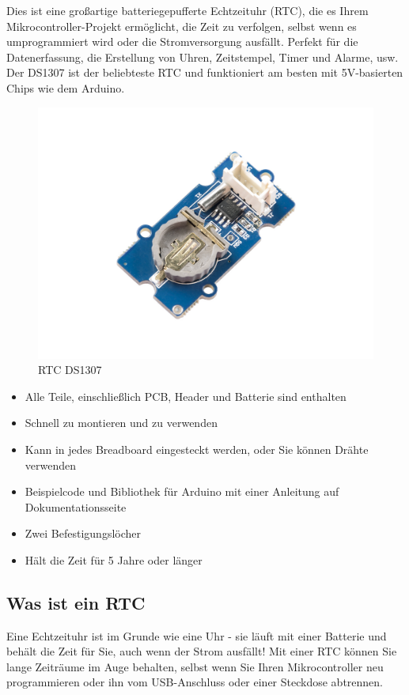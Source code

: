 \documentclass[conference]{IEEEtran}
\begin{document}
Dies ist eine großartige batteriegepufferte Echtzeituhr (RTC), die es Ihrem Mikrocontroller-Projekt ermöglicht, die Zeit zu verfolgen, selbst wenn es umprogrammiert wird oder die Stromversorgung ausfällt. Perfekt für die Datenerfassung, die Erstellung von Uhren, Zeitstempel, Timer und Alarme, usw. Der DS1307 ist der beliebteste RTC und funktioniert am besten mit 5V-basierten Chips wie dem Arduino.

\begin{figure}[h]
	\begin{center}
		\includegraphics[scale=0.45]{rtc1}
	\end{center}
	\caption{RTC DS1307}
\end{figure}

\begin{itemize}
	\item Alle Teile, einschließlich PCB, Header und Batterie sind enthalten
	\item Schnell zu montieren und zu verwenden
	\item Kann in jedes Breadboard eingesteckt werden, oder Sie können Drähte verwenden
	\item Beispielcode und Bibliothek für Arduino mit einer Anleitung auf  Dokumentationsseite
	\item Zwei Befestigungslöcher
	\item Hält die Zeit für 5 Jahre oder länger
\end{itemize}


\subsection{Was ist ein RTC}
Eine Echtzeituhr ist im Grunde wie eine Uhr - sie läuft mit einer Batterie und behält die Zeit für Sie, auch wenn der Strom ausfällt! Mit einer RTC können Sie lange Zeiträume im Auge behalten, selbst wenn Sie Ihren Mikrocontroller neu programmieren oder ihn vom USB-Anschluss oder einer Steckdose abtrennen.
\end{document}
